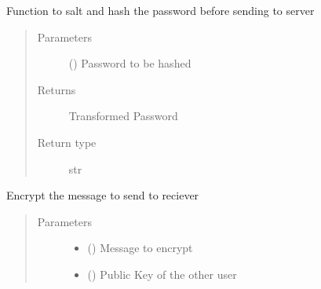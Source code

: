 \documentclass[letterpaper,10pt,english]{sphinxmanual}
\begin{document}
\begin{fulllineitems}
\begin{fulllineitems}
\begin{quote}
\begin{description}
\end{description}\end{quote}

\end{fulllineitems}


\begin{fulllineitems}
\label{\detokenize{Message:Message.Message._hash_password}}
Function to salt and hash the password before sending to server
\begin{quote}\begin{description}
\item[{Parameters}] \leavevmode
{} () \textendash{} Password to be hashed

\item[{Returns}] \leavevmode
Transformed Password

\item[{Return type}] \leavevmode
str

\end{description}\end{quote}

\end{fulllineitems}


\begin{fulllineitems}
\label{\detokenize{Message:Message.Message._encryptE2E}}
Encrypt the message to send to reciever
\begin{quote}\begin{description}
\item[{Parameters}] \leavevmode\begin{itemize}
\item {} 
 () \textendash{} Message to encrypt

\item {} 
 () \textendash{} Public Key of the other user


\end{itemize}
\end{description}
\end{quote}
\end{fulllineitems}
\end{fulllineitems}
\end{document}
